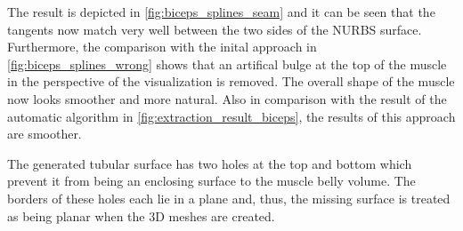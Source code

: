 The result is depicted in \cref{fig:biceps_splines_seam} and it can be seen that the tangents now match very well between the two sides of the NURBS surface. Furthermore, the comparison with the inital approach in \cref{fig:biceps_splines_wrong} shows that an artifical bulge at the top of the muscle in the perspective of the visualization is removed. The overall shape of the muscle now looks smoother and more natural. Also in comparison with the result of the automatic algorithm in \cref{fig:extraction_result_biceps}, the results of this approach are smoother.

The generated tubular surface has two holes at the top and bottom which prevent it from being an enclosing surface to the muscle belly volume. The borders of these holes each lie in a plane and, thus, the missing surface is treated as being planar when the 3D meshes are created.
%
